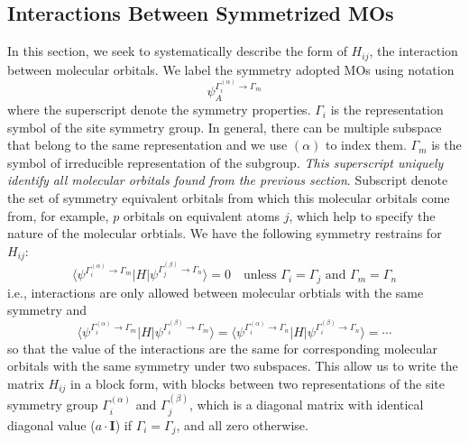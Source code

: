 \documentclass{article}
\begin{document}
\subsection{Interactions Between Symmetrized MOs}
In this section, we seek to systematically describe the form of $H_{ij}$, the interaction between molecular orbitals. We 
label the symmetry adopted MOs using notation
\begin{equation}
    \psi^{\Gamma_i^{(\alpha)} \to \Gamma_m}_A
\end{equation}
where the superscript denote the symmetry properties. $\Gamma_i$ is the representation symbol of the site symmetry group. 
In general, there can be multiple subspace that belong to the same representation and we use $(\alpha)$ to index them. 
$\Gamma_m$ is the symbol of irreducible representation of the subgroup. \emph{This superscript uniquely identify all molecular 
orbitals found from the previous section}. 
Subscript denote the set of symmetry equivalent orbitals from which this molecular orbitals come from, 
for example, $p$ orbitals on equivalent atoms $j$, which help to specify
the nature of the molecular orbtials. We have the following symmetry restrains for $H_{ij}$:
\begin{equation}
    \langle \psi^{\Gamma_i^{(\alpha)} \to \Gamma_m} |  H | \psi^{\Gamma_j^{(\beta)} \to \Gamma_n} \rangle 
    = 0 \quad \text{unless } \Gamma_i = \Gamma_j\text{ and } \Gamma_m = \Gamma_n
\end{equation}
i.e., interactions are only allowed between molecular orbtials with the same symmetry and 
\begin{equation}
    \langle \psi^{\Gamma_i^{(\alpha)} \to \Gamma_m} |  H | \psi^{\Gamma_i^{(\beta)} \to \Gamma_m} \rangle 
    = \langle \psi^{\Gamma_i^{(\alpha)} \to \Gamma_n} |  H | \psi^{\Gamma_i^{(\beta)} \to \Gamma_n} \rangle 
    = \cdots
\end{equation}
so that the value of the interactions are the same for corresponding molecular orbitals with the same symmetry 
under two subspaces. This allow us to write the matrix $H_{ij}$ in a block form, with blocks between two 
representations of the site symmetry group $\Gamma_i^{(\alpha)}$ and $\Gamma_j^{(\beta)}$, which is a 
diagonal matrix with identical diagonal value ($a\cdot \mathbf{I}$) if $\Gamma_i = \Gamma_j$, and all zero otherwise. 
\end{document}
